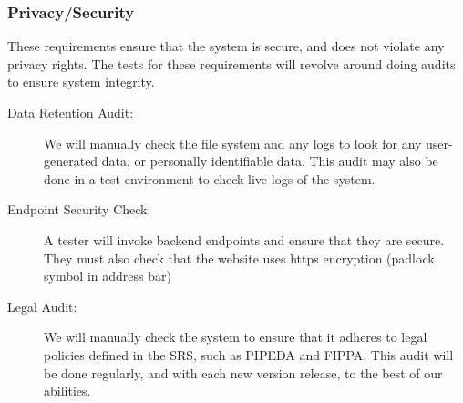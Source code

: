 \documentclass[12pt, titlepage]{article}
\begin{document}
\subsubsection{Privacy/Security}
These requirements ensure that the system is secure, and does not violate any
privacy rights. The tests for these requirements will revolve around doing
audits to ensure system integrity.

\begin{description}
  \item[Data Retention Audit:] We will manually check the file system and any
  logs to look for any user-generated data, or personally identifiable data.
  This audit may also be done in a test environment to check live logs of the
  system.
  \item[Endpoint Security Check:] A tester will invoke backend endpoints and
  ensure that they are secure. They must also check that the website uses https
  encryption (padlock symbol in address bar)
  \item[Legal Audit:] We will manually check the system to ensure that it
  adheres to legal policies defined in the SRS, such as PIPEDA and FIPPA. This
  audit will be done regularly, and with each new version release, to the best
  of our abilities.
\end{description}
\end{document}
